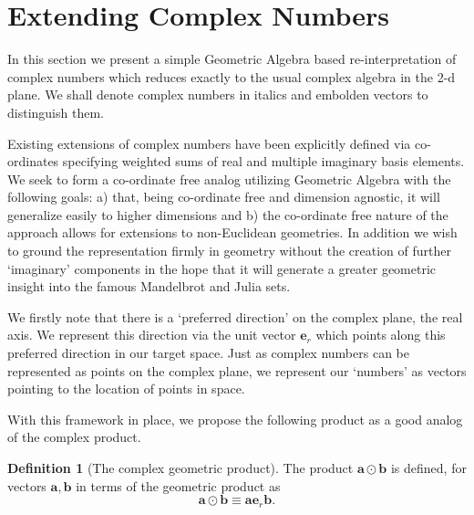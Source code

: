 \documentclass{elsart}
\theoremstyle{definition}
\newtheorem{definition}{Definition}
\newcommand{\complexprod}{\odot}
\begin{document}

\section{Extending Complex Numbers}

In this section we present a simple Geometric Algebra based re-interpretation
of complex numbers\cite{anthonyChina} which reduces exactly to the usual complex algebra in the
2-d plane. We shall denote complex numbers in italics and embolden vectors to
distinguish them.

Existing extensions of complex numbers\cite{FRAC:HypercomplexIterations} have
been explicitly defined via co-ordinates specifying weighted sums of real and
multiple imaginary basis elements. We seek to form a co-ordinate free analog 
utilizing Geometric Algebra with the following goals: a) that, being
co-ordinate free and dimension agnostic, it will generalize easily to higher
dimensions and b) the co-ordinate free nature of the approach allows for
extensions to non-Euclidean geometries. In addition we wish to ground the
representation firmly in geometry without the creation of further `imaginary'
components in the hope that it will generate a greater geometric insight into
the famous Mandelbrot and Julia sets.

We firstly note that there is a `preferred direction' on the complex plane, the
real axis. We represent this direction via the unit vector ${\mathbf e}_r$
which points along this preferred direction in our target space. Just as
complex numbers can be represented as points on the complex plane, we represent
our `numbers' as vectors pointing to the location of points in space.

With this framework in place, we propose the following product as a good analog
of the complex product.

\begin{definition}[The complex geometric product]
The product ${\mathbf a} \complexprod {\mathbf b}$ is defined, for vectors 
${\mathbf a}, {\mathbf b}$ in terms of the geometric 
product\cite{hestenes,WarehamThesis} as
\begin{equation}
{\mathbf a} \complexprod {\mathbf b} \equiv {\mathbf a}{\mathbf e}_r{\mathbf b}.
\end{equation}
\end{definition}
\end{document}
